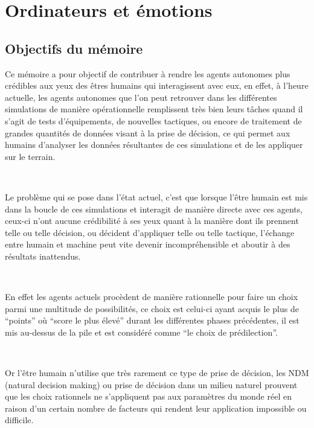 
\chapter{Ordinateurs et émotions} %

\label{Chapter2} %


\section{Objectifs du mémoire}

Ce mémoire a pour objectif de contribuer à rendre les agents autonomes plus crédibles aux yeux des êtres humains qui interagissent avec eux, en effet, à l’heure actuelle, les agents autonomes que l’on peut retrouver dans les différentes simulations de manière opérationnelle remplissent très bien leurs tâches quand il s’agit de tests d’équipements, de nouvelles tactiques, ou encore de traitement de grandes quantités de données visant à la prise de décision,  ce qui permet aux humains d’analyser les données résultantes de ces simulations et de les appliquer sur le terrain.

~\par
Le problème qui se pose dans l’état actuel, c’est que lorsque l'être humain est mis dans la boucle de ces simulations et interagit de manière directe avec ces agents, ceux-ci n’ont aucune crédibilité à ses yeux quant à la manière dont ils prennent telle ou telle décision, ou décident d’appliquer telle ou telle tactique, l’échange entre humain et machine peut vite devenir incompréhensible et aboutir à des résultats inattendus.

~\par
En effet les agents actuels procèdent de manière rationnelle pour faire un choix parmi une multitude de possibilités, ce choix est celui-ci ayant acquis le plus de “points” où “score le plus élevé” durant les différentes phases précédentes, il est mis au-dessus de la pile et est considéré comme “le choix de prédilection”. 

~\par
Or l'être humain n’utilise que très rarement ce type de prise de décision, les NDM (natural decision making) ou prise de décision dans un milieu naturel prouvent que les choix rationnels ne s'appliquent pas aux paramètres du monde réel en raison d'un certain nombre de facteurs qui rendent leur application impossible ou difficile. 



